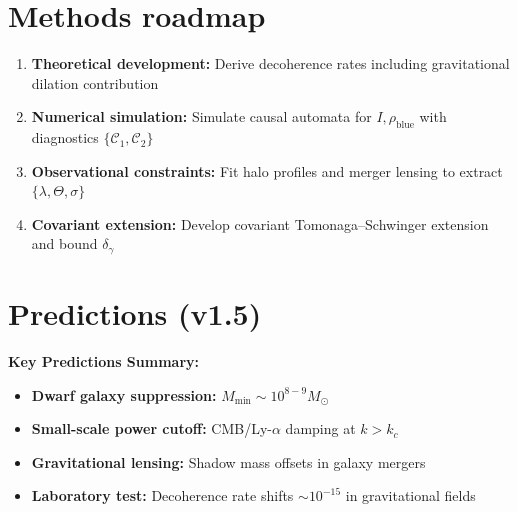 \documentclass[11pt]{article}
\begin{document}
\section{Methods roadmap}

\begin{enumerate}[leftmargin=1.5em, itemsep=0.5em]
\item \textbf{Theoretical development:} Derive decoherence rates including gravitational dilation contribution
\item \textbf{Numerical simulation:} Simulate causal automata for $I,\rho_{\mathrm{blue}}$ with diagnostics $\{\mathcal C_1,\mathcal C_2\}$
\item \textbf{Observational constraints:} Fit halo profiles and merger lensing to extract $\{\lambda,\Theta,\sigma\}$
\item \textbf{Covariant extension:} Develop covariant Tomonaga--Schwinger extension and bound $\delta_\gamma$
\end{enumerate}

\vspace{1em}

\section{Predictions (v1.5)}

\begin{keyresult}
\textbf{Key Predictions Summary:}
\begin{itemize}[leftmargin=1em, itemsep=0.5em]
    \item \textbf{Dwarf galaxy suppression:} $M_{\min} \sim 10^{8-9} M_\odot$
    \item \textbf{Small-scale power cutoff:} CMB/Ly-$\alpha$ damping at $k > k_c$
    \item \textbf{Gravitational lensing:} Shadow mass offsets in galaxy mergers
    \item \textbf{Laboratory test:} Decoherence rate shifts $\sim 10^{-15}$ in gravitational fields
\end{itemize}
\end{keyresult}

\vspace{1em}
\end{document}
